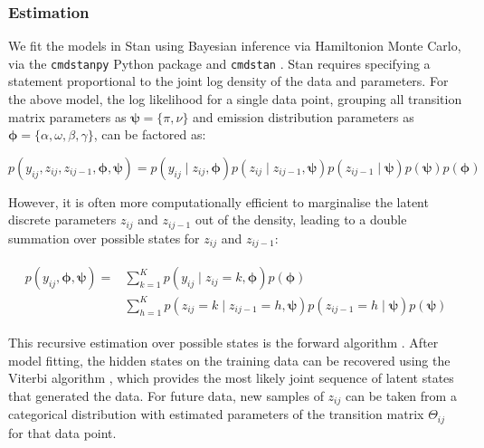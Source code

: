 \subsubsection{Estimation}
We fit the models in Stan \citep{stan2017} using Bayesian inference
via Hamiltonion Monte Carlo, via the \texttt{cmdstanpy} \citep{cmdstanpy2024}
Python package and \texttt{cmdstan} \citep{cmdstan2024}. Stan requires specifying a statement
proportional to the joint log density of the data and parameters.
For the above model, the log likelihood for a single data point,
grouping all transition matrix parameters as $\bm{\psi} = \{\pi, \nu\}$
and emission distribution parameters as $\bm{\phi} = \{\alpha,
\omega, \beta, \gamma\}$, can be factored as:

\begin{equation}
p(y_{ij}, z_{ij}, z_{ij-1}, \bm{\phi}, \bm{\psi}) = 
    p(y_{ij} \mid  z_{ij}, \bm{\phi})
    p(z_{ij} \mid z_{ij-1}, \bm{\psi})
    p(z_{ij-1} \mid \bm{\psi})
    p(\bm{\psi})
    p(\bm{\phi})
\end{equation}

However, it is often more computationally
efficient to marginalise the
latent discrete parameters $z_{ij}$ and
$z_{ij-1}$ out of the
density, leading to a double summation
over possible states for $z_{ij}$ and $z_{ij-1}$:

\begin{align}
    \begin{split}
    p(y_{ij}, \bm{\phi}, \bm{\psi}) = 
    &\sum_{k=1}^{K}
    p(y_{ij} \mid z_{ij} = k, \bm{\phi})
    p(\bm{\phi})\\
    &\sum_{h=1}^{K}
    p(z_{ij} = k \mid z_{ij-1} = h, \bm{\psi})
    p(z_{ij-1}  = h \mid \bm{\psi})
    p(\bm{\psi})
    \end{split}
\end{align}

This recursive estimation over possible states
is the forward algorithm \citep{rabiner1989}.
After model fitting, the hidden states on the
training data can be recovered using the
Viterbi algorithm \citep{rabiner1989},
which provides the most likely joint
sequence of latent states that generated
the data. For future data, new samples of
$z_{ij}$ can be taken from a categorical
distribution with estimated parameters of
the transition matrix $\Theta_{ij}$ for
that data point.

